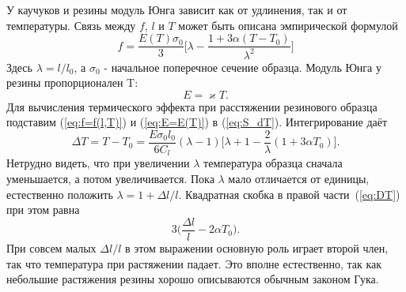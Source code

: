 \documentclass[a4paper,12pt]{article} %
\begin{document}
		У каучуков и резины модуль Юнга зависит как от удлинения, так и от температуры. Связь между $f$, $l$ и $T$ может быть описана эмпирической формулой
			\begin{equation} \label{eq:f=f(l,T)}
				f = \frac{E(T)\sigma_0}{3}\biggr[\lambda - \frac{1 + 3\alpha (T - T_0)}{\lambda^2}\biggl]
			\end{equation}
Здесь $\lambda = l / l_0$, а $\sigma_0$ - начальное поперечное сечение образца. Модуль Юнга у резины пропорционален T:
			\begin{equation} \label{eq:E=E(T)}
				E = \varkappa T.
			\end{equation}
		Для вычисления термического эффекта при расстяжении резинового образца подставим (\ref{eq:f=f(l,T)}) и (\ref{eq:E=E(T)}) в (\ref{eq:S_dT}). Интегрирование даёт
			\begin{equation} \label{eq:DT}
				\Delta T = T - T_0 = \frac{E \sigma_0 l_0}{6C_l} (\lambda - 1) \biggr[\lambda + 1 - \frac{2}{\lambda} (1 + 3\alpha T_0) \biggl].
			\end{equation}				
		Нетрудно видеть, что при увеличении $\lambda$ температура образца сначала уменьшается, а потом увеличивается. Пока $\lambda$ мало отличается от единицы, естественно положить $\lambda = 1 + \Delta l/l$. Квадратная скобка в правой части~(\ref{eq:DT}) при этом равна
			\begin{equation*}
				3\biggr( \frac{\Delta l}{l} - 2\alpha T_0 \biggl).
			\end{equation*}
		При совсем малых $\Delta l / l$ в этом выражении основную роль играет второй член, так что температура при растяжении падает. Это вполне естественно, так как небольшие растяжения резины хорошо описываются обычным законом Гука.
\end{document}
